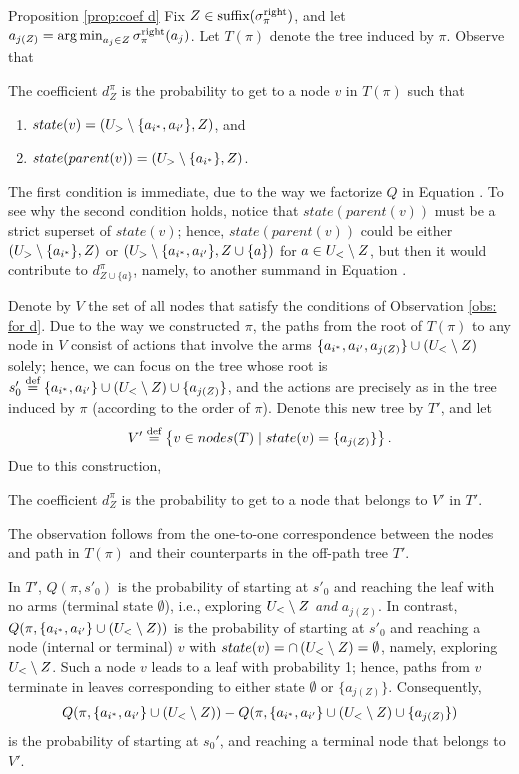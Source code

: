 \begin{proofof}{Proposition \ref{prop:coef d}}
Fix $Z\in \textnormal{suffix}(\sigma^{\textnormal{right}}_\pi)$, and let $a_{j(Z)} = \operatorname*{arg\,min}_{a_j\in Z}\sigma^{\textnormal{right}}_\pi(a_j)$. Let $T(\pi)$ denote the tree induced by $\pi$. Observe that
\begin{observation}\label{obs: for d}
The coefficient $d^\pi_Z$ is the probability to get to a node $v$ in $T(\pi)$ such that
\begin{enumerate}
\item $state(v)=(U_>\setminus \{a_{i^*},a_{i'} \},Z )$, and 
\item $state(parent(v))=(U_>\setminus \{a_{i^*}\},Z )$. 
\end{enumerate}
\end{observation}
The first condition is immediate, due to the way we factorize $Q$ in Equation . To see why the second condition holds, notice that $state(parent(v))$ must be a strict superset of $state(v)$; hence, $state(parent(v))$ could be either $(U_>\setminus \{a_{i^*}\},Z )$ or $(U_>\setminus \{a_{i^*},a_{i'}\},Z\cup\{ a\} )$ for $a\in U_<\setminus Z$, but then it would contribute to $d^\pi_{Z \cup \{a\}}$, namely, to another summand in Equation . 

Denote by $V$ the set of all nodes that satisfy the conditions of Observation \ref{obs: for d}. Due to the way we constructed $\pi$, the paths from the root of $T(\pi)$ to any node in $V$ consist of actions that involve the arms $\{a_{i^*},a_{i'},a_{j(Z)}\}\cup (U_< \setminus Z)$ solely; hence, we can focus on the  tree whose root is $s_0'\stackrel{\text{def}}{=}\{a_{i^*},a_{i'}\}\cup (U_< \setminus Z)\cup \{a_{j(Z)}\}$, and the actions are precisely as in the tree induced by $\pi$ (according to the order of $\pi$). Denote this new tree by $T'$, and let
\[
V' \stackrel{\text{def}}{=} \left\{v\in nodes(T)\mid state(v)=\{a_{j(Z)}\}  \right\}.
\] 
Due to this construction, 
\begin{observation}\label{obs: for d two}
The coefficient $d^\pi_Z$ is the probability to get to a node that belongs to $V'$  in $T'$.
\end{observation}
The observation follows from the one-to-one correspondence between the nodes and path in $T(\pi)$ and their counterparts in the off-path tree $T'$. 

In $T'$,  $Q(\pi,s'_0)$ is the probability of starting at $s'_0$ and reaching the leaf with no arms (terminal state $\emptyset$), i.e., exploring $U_< \setminus Z$ \textit{and} $a_{j(Z)}$. In contrast, $Q(\pi,\{a_{i^*},a_{i'}\}\cup (U_< \setminus Z))$ is the probability of starting at $s'_0$ and reaching a node (internal or terminal) $v$ with $state(v)= \cap \left(U_< \setminus Z\right) =\emptyset$, namely, exploring $U_< \setminus Z$. Such a node $v$ leads to a leaf with probability 1; hence, paths from $v$ terminate in leaves corresponding to either state $\emptyset$ or  $\{a_{j(Z)}\}$. Consequently,
\[
Q(\pi,\{a_{i^*},a_{i'}\}\cup (U_< \setminus Z)) - Q(\pi,\{a_{i^*},a_{i'}\}\cup (U_< \setminus Z)\cup \{ a_{j(Z)}\})
\]
is the probability of starting at $s_0'$, and reaching a terminal node that belongs to $V'$.
\end{proofof}